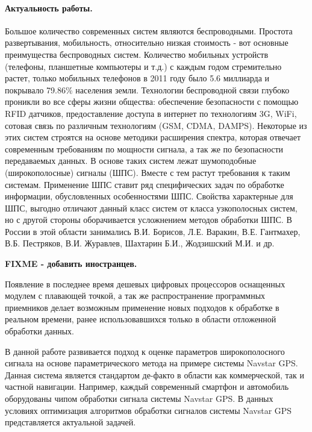 \paragraph{Актуальность работы.} Большое количество современных систем являются беспроводными. Простота развертывания, мобильность, относительно низкая
стоимость - вот основные преимущества беспроводных систем. Количество мобильных устройств (телефоны, планшетные компьютеры
и т.д.) с каждым годом стремительно растет, только мобильных телефонов в 2011 году было 5.6 миллиарда и покрывало 79.86\%
 населения земли. Технологии беспроводной связи глубоко проникли во все сферы жизни общества:
обеспечение безопасности с помощью RFID датчиков, предоставление доступа в интернет по технологиям 3G, WiFi, 
сотовая связь по различным технологиям (GSM, CDMA, DAMPS). Некоторые из этих систем строятся на основе методики
расширения спектра, которая отвечает современным требованиям по мощности сигнала, а так же по безопасности передаваемых
данных. В основе таких систем лежат шумоподобные (широкополосные) сигналы (ШПС). Вместе с тем растут требования к таким
системам. Применение ШПС ставит ряд специфических задач по обработке информации, обусловленных особенностями ШПС.
Свойства характерные для ШПС, выгодно отличают данный класс систем от класса узкополосных систем, но с другой стороны
оборачивается усложнением методов обработки ШПС. В России в этой области занимались В.И. Борисов, Л.Е. Варакин, В.Е. Гантмахер, В.Б. Пестряков, В.И. Журавлев,
Шахтарин Б.И., Жодзишский М.И. и др. 

{\bf{FIXME - добавить иностранцев.}}

Появление в последнее время дешевых цифровых процессоров оснащенных модулем с плавающей точкой, а так же распространение программных приемников
делает возможным применение новых подходов к обработке в реальном времени, ранее использовавшихся только в области отложенной обработки данных.

В данной работе развивается подход к оценке параметров широкополосного сигнала на основе параметрического метода на примере системы Navstar GPS. 
Данная система является стандартом де-факто в области как коммерческой, так и частной навигации. Например, каждый современный смартфон и автомобиль оборудованы
чипом обработки сигнала системы Navstar GPS. В данных условиях оптимизация алгоритмов обработки сигналов системы Navstar GPS
представляется актуальной задачей.

%
%

